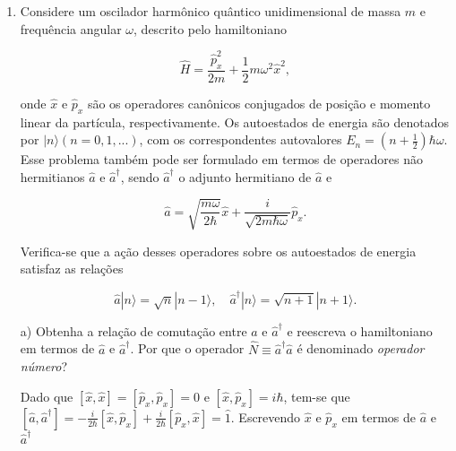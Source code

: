 \begin{enumerate}[start=1,label={\bfseries Q\arabic*.}]
\item Considere um oscilador harmônico quântico unidimensional de massa $m$ e frequência angular $\omega$,  descrito pelo hamiltoniano

$$
\hat{H} = \frac{\hat{p}_{x}^{2}}{2m} + \frac{1}{2} m \omega^{2} \hat{x}^{2},
$$

onde $\hat{x}$ e $\hat{p}_{x}$ são os operadores canônicos conjugados de posição e momento linear da partícula, respectivamente. Os autoestados de energia são denotados por $|n\rangle (n = 0,1,...)$, com os correspondentes autovalores $E_{n} = \left( n + \frac{1}{2} \right) \hbar \omega $. Esse problema também pode ser formulado em termos de operadores não hermitianos $\hat{a}$ e $\hat{a}^{\dagger}$, sendo $\hat{a}^{\dagger}$ o adjunto hermitiano de $\hat{a}$ e

$$
\hat{a} = \sqrt{\frac{m\omega}{2\hbar}} \hat{x} + \frac{i}{\sqrt{2m\hbar \omega}} \hat{p}_{x}.
$$

Verifica-se que a ação desses operadores sobre os autoestados de energia satisfaz as relações

$$
\hat{a} |n \rangle  = \sqrt{n} |n - 1 \rangle, \quad \hat{a}^{\dagger} |n \rangle = \sqrt{n+1} | n + 1 \rangle.
$$



  a) Obtenha a relação de comutação entre $\hat{a}$ e $\hat{a}^{\dagger}$ e reescreva o hamiltoniano em termos de $\hat{a}$ e $\hat{a}^{\dagger}$. Por que o operador $\hat{N} \equiv  \hat{a}^{\dagger} \hat{a}$ é denominado \textit{operador número}?

  \resposta  Dado que $[\hat{x}, \hat{x}]=\left[\hat{p}_{x}, \hat{p}_{x}\right]=0 $ e $\left[\hat{x}, \hat{p}_{x}\right]=i \hbar$, tem-se que $\left[\hat{a}, \hat{a}^{\dagger}\right]=-\frac{i}{2 \hbar}\left[\hat{x}, \hat{p}_{x}\right]+\frac{i}{2 \hbar}\left[\hat{p}_{x}, \hat{x}\right]=\hat{1}$. Escrevendo $\hat{x}$ e $\hat{p}_{x}$ em termos de $\hat{a}$ e $\hat{a}^{\dagger}$


\end{enumerate}
